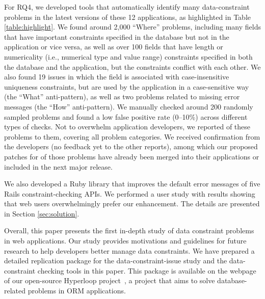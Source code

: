 {For RQ4}, we developed tools that automatically identify many
data-constraint problems in the latest versions of these 12 applications, as highlighted in Table \ref{table:highlight}.  
We found around 2,000
``Where'' problems, including many fields
that have important constraints specified in the database
but not in the application or vice versa, as well as
over 100 fields that have length or numericality (i.e., numerical type and value range)
constraints specified in both the database and the application, 
but the constraints conflict with each other. We also found 19
issues in which the field is associated with case-insensitive uniqueness constraints, 
but are used by the application in a case-sensitive way
(the ``What'' anti-pattern), as well as
two problems related to missing error messages (the ``How'' anti-pattern).
We manually checked around 200 randomly sampled problems and found a low
false positive rate (0--10\%) across different types of checks. 
Not to overwhelm application developers, 
we reported \numreportedissues of these problems to them, covering all problem categories. We received \numconfirmedissues confirmation from the developers (no feedback yet to the other \numunconfirmedissues reports), among which our proposed patches for \nummergedissues of those problems have already been merged into their applications or included in the next major release. 

We also developed a Ruby library that improves the default error messages of
five Rails constraint-checking APIs. We performed a user study with results showing that web users overwhelmingly prefer our enhancement.
The details are presented in Section \ref{sec:solution}.
 
Overall, this paper presents the first in-depth study of data constraint problems in web applications.
Our study provides motivations and guidelines for future research to help developers
better manage data constraints.   We have prepared
a detailed replication package for the data-constraint-issue study and the data-constraint checking tools  in this paper. This package is available on the webpage of our open-source Hyperloop project~\cite{hyperloop}, a
project that aims to solve database-related problems
in ORM applications.
